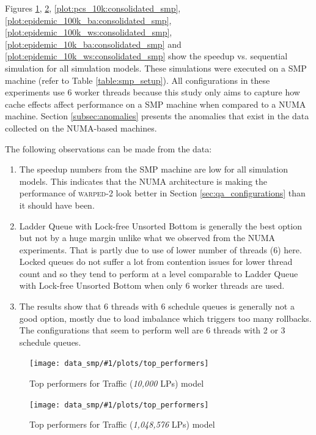 \documentclass[11pt]{book}
\newcommand{\plotOverallSMP}[3]{
\begin{figure}
  \centerline{\texttt{[image: data\_smp/\#1/plots/top\_performers]}}
  \caption{#2}\label{#3}
\end{figure}
}
\begin{document}
Figures \ref{plot:traffic_10k:consolidated_smp}, \ref{plot:traffic_1m:consolidated_smp},
\ref{plot:pcs_10k:consolidated_smp}, \ref{plot:epidemic_100k_ba:consolidated_smp},
\ref{plot:epidemic_100k_ws:consolidated_smp}, \ref{plot:epidemic_10k_ba:consolidated_smp} and
\ref{plot:epidemic_10k_ws:consolidated_smp} show the speedup vs. sequential simulation for all simulation
models. These simulations were executed on a SMP machine (refer to Table \ref{table:smp_setup}). All
configurations in these experiments use 6 worker threads because this study only aims to capture how cache
effects affect performance on a SMP machine when compared to a NUMA machine. Section \ref{subsec:anomalies}
presents the anomalies that exist in the data collected on the NUMA-based machines.

The following observations can be made from the data:

\begin{enumerate}
  \item The speedup numbers from the SMP machine are low for all simulation models. This indicates that
        the NUMA architecture is making the performance of \textsc{warped-2} look better in Section
        \ref{sec:qa_configurations} than it should have been.

  \item Ladder Queue with Lock-free Unsorted Bottom is generally the best option but not by a huge margin
        unlike what we observed from the NUMA experiments. That is partly due to use of lower number of
        threads (6) here. Locked queues do not suffer a lot from contention issues for lower thread count
        and so they tend to perform at a level comparable to Ladder Queue with Lock-free Unsorted Bottom
        when only 6 worker threads are used.

  \item The results show that 6 threads with 6 schedule queues is generally not a good option, mostly due
        to load imbalance which triggers too many rollbacks. The configurations that seem to perform well
        are 6 threads with 2 or 3 schedule queues. 
\end{enumerate}

\plotOverallSMP{traffic_10k}
               {Top performers for Traffic (\emph{10,000} LPs) model}
               {plot:traffic_10k:consolidated_smp}

\plotOverallSMP{traffic_1m}
               {Top performers for Traffic (\emph{1,048,576} LPs) model}
               {plot:traffic_1m:consolidated_smp}
\end{document}
